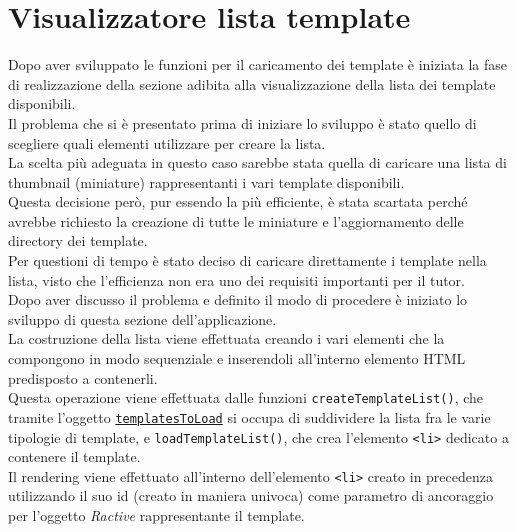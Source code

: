 \section{Visualizzatore lista template}
Dopo aver sviluppato le funzioni per il caricamento dei template è iniziata la fase di realizzazione della sezione adibita alla visualizzazione della lista dei template disponibili.\\
Il problema che si è presentato prima di iniziare lo sviluppo è stato quello di scegliere quali elementi utilizzare per creare la lista.\\
La scelta più adeguata in questo caso sarebbe stata quella di caricare una lista di thumbnail (miniature) rappresentanti i vari template disponibili.\\
Questa decisione però, pur essendo la più efficiente, è stata scartata perché avrebbe richiesto la creazione di tutte le miniature e l'aggiornamento delle directory dei template.\\
Per questioni di tempo è stato deciso di caricare direttamente i template nella lista, visto che l'efficienza non era uno dei requisiti importanti per il tutor.\\
Dopo aver discusso il problema e definito il modo di procedere è iniziato lo sviluppo di questa sezione dell'applicazione.\\
La costruzione della lista viene effettuata creando i vari elementi che la compongono in modo sequenziale e inserendoli all'interno elemento HTML predisposto a contenerli.\\
Questa operazione viene effettuata dalle funzioni \texttt{createTemplateList()}, che tramite l'oggetto \hyperref[ttlObject]{\texttt{templatesToLoad}} si occupa di suddividere la lista fra le varie tipologie di template, e \texttt{loadTemplateList()}, che crea l'elemento \texttt{<li>} dedicato a contenere il template.\\
Il rendering viene effettuato all'interno dell'elemento \texttt{<li>} creato in precedenza utilizzando il suo id (creato in maniera univoca) come parametro di ancoraggio per l'oggetto \textit{Ractive} rappresentante il template.
